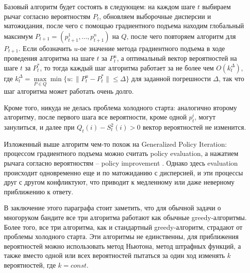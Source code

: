 \documentclass{article}
\begin{document}
\begin{enumerate}
    Базовый алгоритм будет состоять в следующем: на каждом шаге $t$ выбираем рычаг согласно вероятностям $P_t$, обновляем выборочные дисперсии и матожидания, после чего с помощью градиентного подъема находим глобальный максимум $P_{t+1} = (p_{t+1}^1, ..., p_{t+1}^n)$ на $Q$, после чего повторяем алгоритм для $P_{t+1}$. Если обозначить $u$-ое значение метода градиентного подъема в ходе проведения алгоритма на шаге $t$ за $P_t^u$, а оптимальный вектор вероятностей на шаге $t$ за $P_t^*$, то тогда каждый шаг алгоритма работает за не более чем $O(k_t^{\Delta})$, где $k_t^{\Delta} = \underset{P \in Q}{\max} \min \{u: \| P_t^u - P_t^* \| \leq \Delta\}$ для заданной погрешности $\Delta$, так что шаг алгоритма может работать очень долго.

    Кроме того, никуда не делась проблема холодного старта: аналогично второму алгоритму, после первого шага все вероятности, кроме одной $p_t^i$, могут занулиться, и далее при $Q_t(i) - S_t^2(i) > 0$ вектор вероятностей не изменится.

    Изложенный выше алгоритм чем-то похож на Generalized Policy Iteration: процессом градиентного подъема можно считать policy evaluation, а нажатием рычага согласно вероятностям -- policy improvement \cite{suttonbarto_policy_iteration}. Однако здесь evaluation происходит одновременно еще и по матожиданию с дисперсией, и эти процессы друг с другом конфликтуют, что приводит к медленному или даже неверному приближению к ответу.
\end{enumerate}

В заключение этого параграфа стоит заметить, что для обычной задачи о многоруком бандите все три алгоритма работают как обычные greedy-алгоритмы. Более того, все три алгоритма, как и стандартный greedy-алгоритм, страдают от проблемы холодного старта. Эти алгоритмы не единственны, для приближения вероятностей можно использовать метод Ньютона, метод штрафных функций, а также вместо одной или всех вероятностей пытаться за один ход изменять $k$ вероятностей, где $k = const$.
\end{document}
